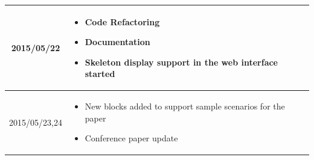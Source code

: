 \documentclass[11pt]{article} %
\begin{document}
\begin{center}
\begin{longtable}{ | c | p{6cm} | p{5cm} |}
  2015/05/22         & 
  \begin{itemize}
  \item Code Refactoring
  \item Documentation
  \item Skeleton display support in the web interface started
\end{itemize}   
  & 
\\
  										 \hline
  										 
  2015/05/23,24         & 
  \begin{itemize}
  \item New blocks added to support sample scenarios for the paper
  \item Conference paper update
\end{itemize}   
  & 
\\
  										 \hline										 
  										   								 
    \end{longtable}
\end{center}
\end{document}
